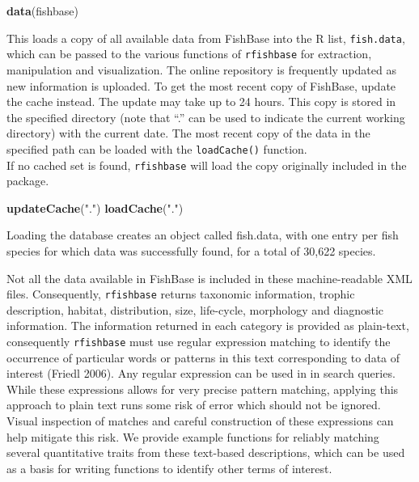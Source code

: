 \documentclass[author-year]{elsarticle} %
\newenvironment{Shaded}{}{}
\newcommand{\KeywordTok}[1]{\textcolor[rgb]{0.00,0.44,0.13}{\textbf{{#1}}}}
\newcommand{\StringTok}[1]{\textcolor[rgb]{0.25,0.44,0.63}{{#1}}}
\newcommand{\NormalTok}[1]{{#1}}
\begin{document}
\begin{Shaded}
\begin{Highlighting}[]
\KeywordTok{data}\NormalTok{(fishbase) }
\end{Highlighting}
\end{Shaded}
This loads a copy of all available data from FishBase into the R list,
\texttt{fish.data}, which can be passed to the various functions of
\texttt{rfishbase} for extraction, manipulation and visualization. The
online repository is frequently updated as new information is uploaded.
To get the most recent copy of FishBase, update the cache instead. The
update may take up to 24 hours. This copy is stored in the specified
directory (note that ``.'' can be used to indicate the current working
directory) with the current date. The most recent copy of the data in
the specified path can be loaded with the \texttt{loadCache()}
function.\\If no cached set is found, \texttt{rfishbase} will load the
copy originally included in the package.

\begin{Shaded}
\begin{Highlighting}[]
\KeywordTok{updateCache}\NormalTok{(}\StringTok{"."}\NormalTok{)}
\KeywordTok{loadCache}\NormalTok{(}\StringTok{"."}\NormalTok{)}
\end{Highlighting}
\end{Shaded}
Loading the database creates an object called fish.data, with one entry
per fish species for which data was successfully found, for a total of
30,622 species.

Not all the data available in FishBase is included in these
machine-readable XML files. Consequently, \texttt{rfishbase} returns
taxonomic information, trophic description, habitat, distribution, size,
life-cycle, morphology and diagnostic information. The information
returned in each category is provided as plain-text, consequently
\texttt{rfishbase} must use regular expression matching to identify the
occurrence of particular words or patterns in this text corresponding to
data of interest (Friedl 2006). Any regular expression can be used in in
search queries. While these expressions allows for very precise pattern
matching, applying this approach to plain text runs some risk of error
which should not be ignored. Visual inspection of matches and careful
construction of these expressions can help mitigate this risk. We
provide example functions for reliably matching several quantitative
traits from these text-based descriptions, which can be used as a basis
for writing functions to identify other terms of interest.
\end{document}
